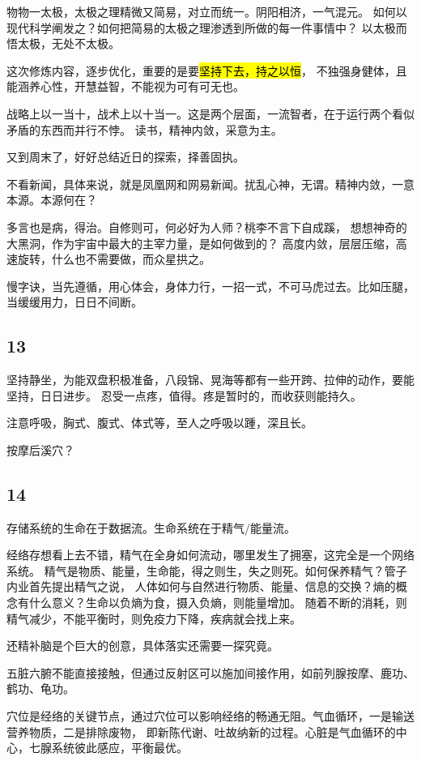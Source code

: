 物物一太极，太极之理精微又简易，对立而统一。阴阳相济，一气混元。
如何以现代科学阐发之？如何把简易的太极之理渗透到所做的每一件事情中？
以太极而悟太极，无处不太极。

这次修炼内容，逐步优化，重要的是要\hl{坚持下去，持之以恒}，
不独强身健体，且能涵养心性，开慧益智，不能视为可有可无也。

战略上以一当十，战术上以十当一。这是两个层面，一流智者，在于运行两个看似矛盾的东西而并行不悖。
读书，精神内敛，采意为主。

又到周末了，好好总结近日的探索，择善固执。

不看新闻，具体来说，就是凤凰网和网易新闻。扰乱心神，无谓。精神内敛，一意本源。本源何在？

多言也是病，得治。自修则可，何必好为人师？桃李不言下自成蹊，
想想神奇的大黑洞，作为宇宙中最大的主宰力量，是如何做到的？
高度内敛，层层压缩，高速旋转，什么也不需要做，而众星拱之。

慢字诀，当先遵循，用心体会，身体力行，一招一式，不可马虎过去。比如压腿，当缓缓用力，日日不间断。

\subsection{13}

坚持静坐，为能双盘积极准备，八段锦、晃海等都有一些开跨、拉伸的动作，要能坚持，日日进步。
忍受一点疼，值得。疼是暂时的，而收获则能持久。

注意呼吸，胸式、腹式、体式等，至人之呼吸以踵，深且长。

按摩后溪穴？

\subsection{14}

存储系统的生命在于数据流。生命系统在于精气/能量流。

经络存想看上去不错，精气在全身如何流动，哪里发生了拥塞，这完全是一个网络系统。
精气是物质、能量，生命能，得之则生，失之则死。如何保养精气？管子内业首先提出精气之说，
人体如何与自然进行物质、能量、信息的交换？熵的概念有什么意义？生命以负熵为食，摄入负熵，则能量增加。
随着不断的消耗，则精气减少，不能平衡时，则免疫力下降，疾病就会找上来。

还精补脑是个巨大的创意，具体落实还需要一探究竟。

五脏六腑不能直接接触，但通过反射区可以施加间接作用，如前列腺按摩、鹿功、鹤功、龟功。

穴位是经络的关键节点，通过穴位可以影响经络的畅通无阻。气血循环，一是输送营养物质，二是排除废物，
即新陈代谢、吐故纳新的过程。心脏是气血循环的中心，七腺系统彼此感应，平衡最优。

